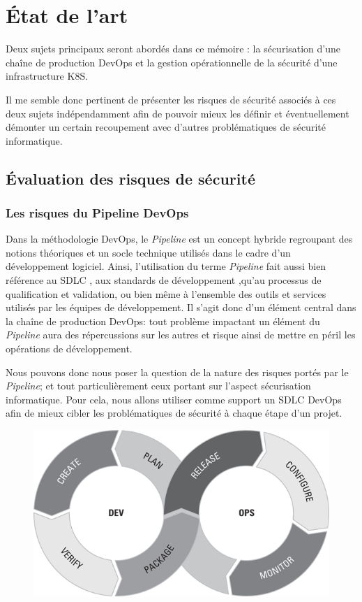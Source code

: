 \chapter{État de l'art}
Deux sujets principaux seront abordés dans ce mémoire : la sécurisation d'une chaîne de production DevOps et la 
gestion opérationnelle de la sécurité d'une infrastructure \ac{K8S}.

Il me semble donc pertinent de présenter les risques de sécurité associés à ces deux sujets indépendamment afin de 
pouvoir mieux les définir et éventuellement démonter un certain recoupement avec d'autres problématiques de sécurité 
informatique. 


\section{Évaluation des risques de sécurité}

\subsection{Les risques du Pipeline DevOps}
Dans la méthodologie DevOps, le \emph{Pipeline} est un concept hybride regroupant des notions théoriques et un socle 
technique utilisés dans le cadre d'un développement logiciel. Ainsi, l'utilisation du terme \emph{Pipeline} fait aussi 
bien référence au \ac{SDLC} \autocite[Ch.\ 6]{devops_for_dummies_freeman_forsgren_2019}, aux standards de développement
\autocite[Ch.\ 9]{devops_for_dummies_freeman_forsgren_2019},qu'au processus de qualification et validation, ou bien même
à l'ensemble des outils et services utilisés par les équipes de développement. 
\newline Il s'agit donc d'un élément central dans la chaîne de production DevOps: tout problème impactant un élément du 
\emph{Pipeline} aura des répercussions sur les autres et risque ainsi de mettre en péril les opérations de développement.

Nous pouvons donc nous poser la question de la nature des risques portés par le \emph{Pipeline}; et tout particulièrement
ceux portant sur l'aspect sécurisation informatique.
\newline Pour cela, nous allons utiliser comme support un \ac{SDLC} DevOps afin de mieux cibler les 
problématiques de sécurité à chaque étape d'un projet.

\vspace{0.5em}
\begin{figure}[h]
    \centering
    \includegraphics[width=0.5\linewidth]{resources/img/devops_lifecycle.png}
    \label{fig:devops-lifecycle}
\end{figure}
\newpage

